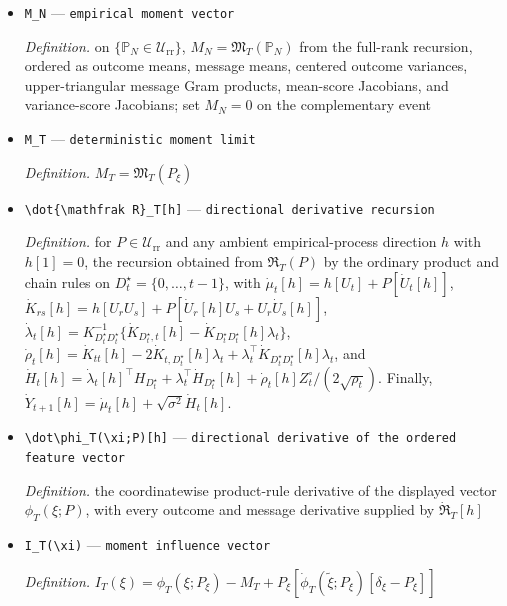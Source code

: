 \documentclass{article}
\begin{document}
\begin{itemize}
  \item \texttt{M\_\allowbreak{}N} --- \texttt{empirical moment vector}
  \par\smallskip\noindent\emph{Definition.} on \(\{\mathbb P_N\in\mathcal U_{\mathrm{rr}}\}\), \(M_N=\mathfrak M_T(\mathbb P_N)\) from the full-rank recursion, ordered as outcome means, message means, centered outcome variances, upper-triangular message Gram products, mean-score Jacobians, and variance-score Jacobians; set \(M_N=0\) on the complementary event
  \item \texttt{M\_\allowbreak{}T} --- \texttt{deterministic moment limit}
  \par\smallskip\noindent\emph{Definition.} \(M_T=\mathfrak M_T(P_\xi)\)
  \item \texttt{\textbackslash{}\allowbreak{}dot\{\textbackslash{}\allowbreak{}mathfrak R\}\allowbreak{}\_\allowbreak{}T[h]} --- \texttt{directional derivative recursion}
  \par\smallskip\noindent\emph{Definition.} for \(P\in\mathcal U_{\mathrm{rr}}\) and any ambient empirical-process direction \(h\) with \(h[1]=0\), the recursion obtained from \(\mathfrak R_T(P)\) by the ordinary product and chain rules on \(D_t^{\star}=\{0,\ldots,t-1\}\), with \(\dot\mu_t[h]=h[U_t]+P[\dot U_t[h]]\), \(\dot K_{rs}[h]=h[U_rU_s]+P[\dot U_r[h]U_s+U_r\dot U_s[h]]\), \(\dot\lambda_t[h]=K_{D_t^{\star}D_t^{\star}}^{-1}\{\dot K_{D_t^{\star},t}[h]-\dot K_{D_t^{\star}D_t^{\star}}[h]\lambda_t\}\), \(\dot\rho_t[h]=\dot K_{tt}[h]-2\dot K_{t,D_t^{\star}}[h]\lambda_t+\lambda_t^{\top}\dot K_{D_t^{\star}D_t^{\star}}[h]\lambda_t\), and \(\dot H_t[h]=\dot\lambda_t[h]^{\top}H_{D_t^{\star}}+\lambda_t^{\top}\dot H_{D_t^{\star}}[h]+\dot\rho_t[h]Z_t^{\circ}/(2\sqrt{\rho_t})\). Finally, \(\dot Y_{t+1}[h]=\dot\mu_t[h]+\sqrt{\sigma^2}\dot H_t[h]\).
  \item \texttt{\textbackslash{}\allowbreak{}dot\textbackslash{}\allowbreak{}phi\_\allowbreak{}T(\textbackslash{}\allowbreak{}xi;\allowbreak{}P)[h]} --- \texttt{directional derivative of the ordered feature vector}
  \par\smallskip\noindent\emph{Definition.} the coordinatewise product-rule derivative of the displayed vector \(\phi_T(\xi;P)\), with every outcome and message derivative supplied by \(\dot{\mathfrak R}_T[h]\)
  \item \texttt{I\_\allowbreak{}T(\textbackslash{}\allowbreak{}xi)} --- \texttt{moment influence vector}
  \par\smallskip\noindent\emph{Definition.} \(I_T(\xi)=\phi_T(\xi;P_\xi)-M_T+P_\xi[\dot\phi_T(\widetilde\xi;P_\xi)[\delta_\xi-P_\xi]]\)

\end{itemize}
\end{document}
